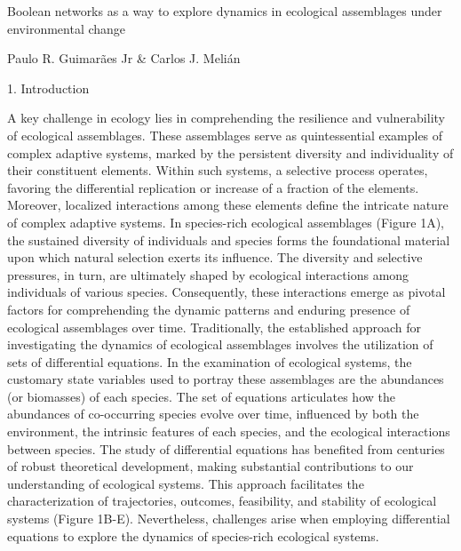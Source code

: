 Boolean networks as a way to explore dynamics in ecological assemblages under environmental change





Paulo R. Guimarães Jr & Carlos J. Melián



    1. Introduction

A key challenge in ecology lies in comprehending the resilience and vulnerability of ecological assemblages. These assemblages serve as quintessential examples of complex adaptive systems, marked by the persistent diversity and individuality of their constituent elements. Within such systems, a selective process operates, favoring the differential replication or increase of a fraction of the elements. Moreover, localized interactions among these elements define the intricate nature of complex adaptive systems. In species-rich ecological assemblages (Figure 1A), the sustained diversity of individuals and species forms the foundational material upon which natural selection exerts its influence. The diversity and selective pressures, in turn, are ultimately shaped by ecological interactions among individuals of various species. Consequently, these interactions emerge as pivotal factors for comprehending the dynamic patterns and enduring presence of ecological assemblages over time.
Traditionally, the established approach for investigating the dynamics of ecological assemblages involves the utilization of sets of differential equations. In the examination of ecological systems, the customary state variables used to portray these assemblages are the abundances (or biomasses) of each species. The set of equations articulates how the abundances of co-occurring species evolve over time, influenced by both the environment, the intrinsic features of each species, and the ecological interactions between species. The study of differential equations has benefited from centuries of robust theoretical development, making substantial contributions to our understanding of ecological systems. This approach facilitates the characterization of trajectories, outcomes, feasibility, and stability of ecological systems (Figure 1B-E). Nevertheless, challenges arise when employing differential equations to explore the dynamics of species-rich ecological systems.
